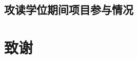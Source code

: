 \section*{攻读学位期间项目参与情况}


\chapter[致谢]{致\quad 谢}%
\thispagestyle{noheaderstyle}%



\cleardoublepage[plain]%

